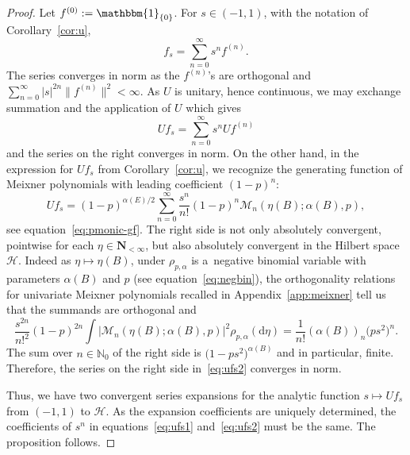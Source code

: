 \documentclass[pdftex]{sigma}
\numberwithin{equation}{section}
\newcommand{\N}{\mathbb{N}}
\newcommand{\dd}{\mathrm{d}} %
\newcommand{\1}{\mathbbm{1}}
\begin{document}
\begin{proof}
	Let $f^{(0)}:= \1_{\{0\}}$. For $s\in (-1,1)$, with the notation of Corollary~\ref{cor:u},
	\[
		f_s = \sum_{n=0}^\infty s^n f^{(n)}.
	\]
	The series converges in norm as the $f^{(n)}$'s are orthogonal and $\sum_{n=0}^\infty |s|^{2n} \bigl\|f^{(n)}\bigr\|^2<\infty$. As $U$ is unitary, hence continuous, we may exchange summation and the application of $U$ which gives
	\begin{equation} \label{eq:ufs1}
		U f_s = \sum_{n=0}^\infty s^n U f^{(n)}
	\end{equation}
	and the series on the right converges in norm. On the other hand, in the expression for $U f_s$ from Corollary~\ref{cor:u}, we recognize the generating function of Meixner polynomials with leading coefficient $(1-p)^n$:
	\begin{equation} \label{eq:ufs2}
		U f_s = (1-p)^{\alpha(E)/2} \sum_{n=0}^\infty \frac{s^n}{n!} (1-p)^n \mathcal M_n( \eta(B);\alpha(B),p),
	\end{equation}
	see equation~\eqref{eq:pmonic-gf}. The right side is not only absolutely convergent, pointwise for each $\eta\in \mathbf N_{<\infty}$, but also absolutely convergent in the Hilbert space $\mathcal H$. Indeed as $\eta\mapsto \eta(B)$, under $\rho_{p,\alpha}$ is a~negative binomial variable with parameters $\alpha(B)$ and $p$ (see equation~\eqref{eq:negbin}), the orthogonality relations for univariate Meixner polynomials recalled in Appendix~\ref{app:meixner} tell us that the summands are orthogonal and
	\[
		\frac{s^{2n}}{n!^2} (1-p)^{2n} \int|\mathcal M_n( \eta(B);\alpha(B),p)|^2 \rho_{p,\alpha}(\dd \eta)
		 = \frac{1}{n!} (\alpha(B))_n \bigl(p s^2\bigr)^{n}.
	\]
	The sum over $n\in \N_0$ of the right side is $\bigl(1-ps^2\bigr)^{\alpha(B)}$ and in particular, finite. Therefore, the series on the right side in~\eqref{eq:ufs2} converges in norm.
	
	Thus, we have two convergent series expansions for the analytic function $s\mapsto U f_s$ from $(-1,1)$ to $\mathcal H$. As the expansion coefficients are uniquely determined, the coefficients of $s^n$ in equations~\eqref{eq:ufs1} and~\eqref{eq:ufs2} must be the same. The proposition follows.
\end{proof}
\end{document}
